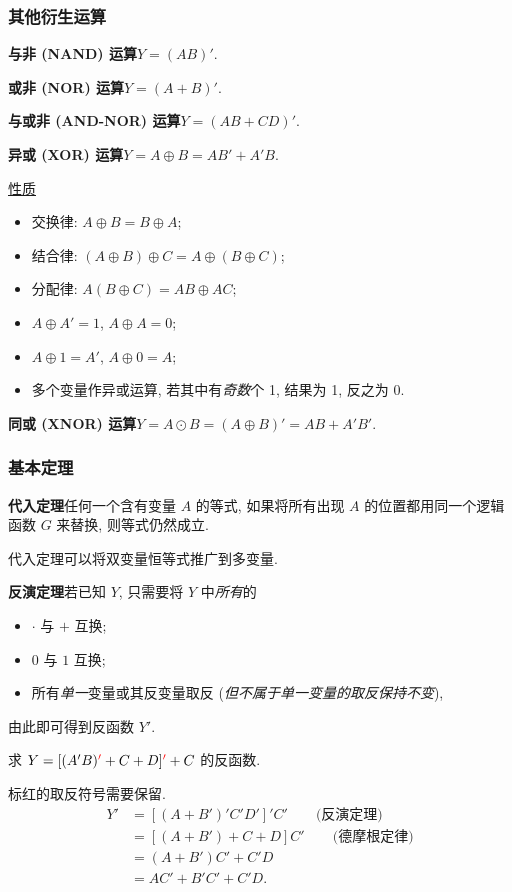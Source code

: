 \subsubsection{其他衍生运算}
\textbf{与非 (NAND) 运算}\quad $Y=(AB)'$.

\textbf{或非 (NOR) 运算}\quad $Y=(A+B)'$.

\textbf{与或非 (AND-NOR) 运算}\quad $Y=(AB+CD)'$.

\textbf{异或 (XOR) 运算}\quad $Y=A\oplus B=AB'+A'B$.

\underline{性质}
\begin{itemize}
    \item 交换律: $A\oplus B=B\oplus A$;
    \item 结合律: $(A\oplus B)\oplus C=A\oplus(B\oplus C)$;
    \item 分配律: $A(B\oplus C)=AB\oplus AC$;
    \item $A\oplus A'=1$, $A\oplus A=0$;
    \item $A\oplus 1=A'$, $A\oplus 0=A$;
    \item 多个变量作异或运算, 若其中有\textit{奇数}个 1, 结果为 1, 反之为 0.
\end{itemize}

\textbf{同或 (XNOR) 运算}\quad $Y=A\odot B=(A\oplus B)'=AB+A'B'$.

\subsubsection{基本定理}
\textbf{代入定理}\quad 任何一个含有变量 $A$ 的等式, 如果将所有出现 $A$ 的位置都用同一个逻辑函数 $G$ 来替换, 则等式仍然成立.

代入定理可以将双变量恒等式推广到多变量.

\textbf{反演定理}\quad 若已知 $Y$, 只需要将 $Y$ 中\textit{所有}的
\begin{itemize}
    \item $\cdot$ 与 $+$ 互换;
    \item $0$ 与 $1$ 互换;
    \item 所有\textit{单一}变量或其反变量取反 (\textit{但不属于单一变量的取反保持不变}),
\end{itemize}
由此即可得到反函数 $Y'$.

\begin{exampleprob}[反演定理的应用]
    求 $Y=[(A'B){\color{red} '}+C+D]{\color{red} '}+C$ 的反函数.

    \begin{solution}
        标红的取反符号需要保留.
        \begin{equation*}
            \begin{aligned}
                Y' & =[(A+B')'C'D']'C' \qquad \text{(反演定理)} \\
                   & =[(A+B')+C+D]C' \qquad \text{(德摩根定律)}  \\
                   & =(A+B')C'+C'D                          \\
                   & =AC'+B'C'+C'D.
            \end{aligned}
        \end{equation*}
    \end{solution}
\end{exampleprob}

